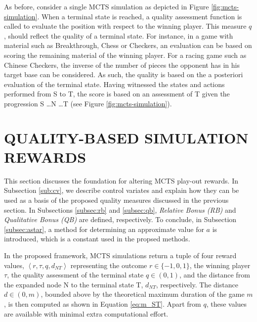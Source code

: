 \documentclass{ecai2014}
\newcommand{\tuple}[1]{\ensuremath{\left \langle #1 \right \rangle }}
\newcommand{\node}[1]{{\fontfamily{phv}\selectfont#1}}
\begin{document}
As before, consider a single MCTS simulation as depicted in Figure \ref{fig:mcts-simulation}. When a terminal state is reached, a quality assessment function is called to evaluate the position with respect to the winning player. This measure $q$, should reflect the quality of a terminal state. For instance, in a game with material such as Breakthrough, Chess or Checkers, an evaluation can be based on scoring the remaining material of the winning player. For a racing game such as Chinese Checkers, the inverse of the number of pieces the opponent has in his target base can be considered. As such, the quality is based on the a posteriori evaluation of the terminal state. Having witnessed the states and actions performed from \node{S} to \node{T}, the score is based on an assessment of \node{T} given the progression \node{S} \ldots \node{N} \ldots \node{T} (see Figure \ref{fig:mcts-simulation}).

\section{QUALITY-BASED SIMULATION REWARDS}
\label{sec:qoreward}
This section discusses the foundation for altering MCTS play-out rewards. In Subsection \ref{sub:cv}, we describe control variates and explain how they can be used as a basis of the proposed quality measures discussed in the previous section. In Subsections \ref{subsec:rb} and \ref{subsec:qb}, \emph{Relative Bonus (RB)} and \emph{Qualitative Bonus (QB)} are defined, respectively. To conclude, in Subsection \ref{subsec:astar}, a method for determining an approximate value for $a$ is introduced, which is a constant used in the propsed methods.

In the proposed framework, MCTS simulations return a tuple of four reward values, $\tuple{r,\tau,q,d_{NT}}$ representing the outcome $r\in\{-1, 0, 1\}$, the winning player $\tau$, the quality assessment of the terminal state $q\in(0, 1)$, and the distance from the expanded node \node{N} to the terminal state \node{T}, $d_{NT}$, respectively. The distance $d\in(0, m)$, bounded above by the theoretical maximum duration of the game $m$, is then computed as shown in Equation \ref{eq:m_ST}. Apart from $q$, these values are available with minimal extra computational effort.
\end{document}
